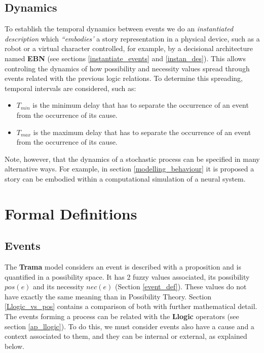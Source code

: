 \documentclass[
		twoside,openright,titlepage,numbers=noenddot,manychapters,
		headinclude,%
                footinclude=false,cleardoublepage=empty,
                BCOR=5mm,
		fontsize=11pt, %
                 enabledeprecatedfontcommands]{scrreprt}
\begin{document}
\subsection{Dynamics}
To establish the temporal dynamics between events we do an \emph{instantiated description} which  \emph{``embodies'} a story representation in a physical device, such as a robot or a virtual character controlled, for example, by a decisional architecture named \textbf{EBN} (see sections \ref{instantiate_events} and \ref{instan_des}). This allows controling the dynamics of how possibility and necessity values spread through events related with the previous logic relations. To determine this spreading, temporal intervals are considered, such as:
\begin{itemize}
	\item $T_{min}$	is the minimum delay that has to separate the occurrence of an event from the occurrence of its cause.
	\item $T_{max}$	is the maximum delay that has to separate the occurrence of an event from the occurrence of its cause.
\end{itemize}	
	
Note, however, that the dynamics of a stochastic process can be specified in many alternative ways. For example, in section \ref{modelling_behaviour}
it is proposed a story can be embodied within a computational simulation of a neural system. %



\section{Formal Definitions}

\subsection{Events}

The \textbf{Trama} model considers an event is described with a proposition and is quantified in a possibility space.  It has 2 fuzzy values associated, its possibility $pos(e)$ and its necessity $nec(e)$ (Section \ref{event_def}).
These values do not have exactly the same meaning than in Possibility Theory. %
Section \ref{Llogic_vs_pos} contains a comparison of both with further mathematical detail.
 The events forming a process can be related with the \textbf{Llogic} operators (see section \ref{ap_llogic}).
To do this, we must consider events also have a cause and a context associated to them, and they can be internal or external, as explained below.
\end{document}
